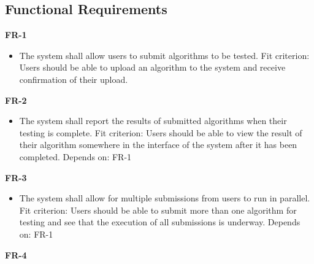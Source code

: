 \documentclass[12pt]{article}
\begin{document}
\subsection{Functional Requirements}
\textbf{FR-1}
\begin{itemize}
    \item The system shall allow users to submit algorithms to be tested. \hfill \break
    Fit criterion: Users should be able to upload an algorithm to the system and receive confirmation of their upload.
\end{itemize}
\textbf{FR-2}
\begin{itemize}
    \item The system shall report the results of submitted algorithms when their testing is complete. \hfill \break
    Fit criterion: Users should be able to view the result of their algorithm somewhere in the interface of the system after it has been completed.
    \break
    Depends on: FR-1
\end{itemize}
\textbf{FR-3}
\begin{itemize}
    \item The system shall allow for multiple submissions from users to run in parallel. \hfill \break
    Fit criterion: Users should be able to submit more than one algorithm for testing and see that the execution of all submissions is underway.
    \break
    Depends on: FR-1
\end{itemize}
\textbf{FR-4}
\end{document}
